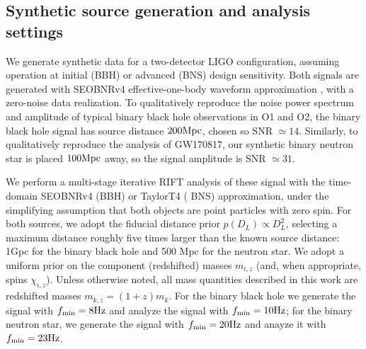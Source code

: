 \documentclass[twocolumn,prd,nofootinbib]{revtex4}
\newcommand\unit[1]{{\rm #1}}
\begin{document}
\subsection{Synthetic source generation and analysis settings}


We generate  synthetic data for a two-detector LIGO configuration, assuming operation at  initial (BBH) or advanced (BNS) design  sensitivity.
Both signals are generated with SEOBNRv4 effective-one-body waveform approximation \cite{2017PhRvD..95d4028B}, with a zero-noise data realization.   
To qualitatively reproduce the noise power spectrum and amplitude of typical binary black hole observations in O1 and
O2, the binary black hole signal has source distance $200 \unit{Mpc}$, chosen so SNR $\simeq 14$.  
Similarly, to qualitatively reproduce the analysis of GW170817, our synthetic binary neutron star is placed $100
\unit{Mpc}$ away, so the signal amplitude is SNR $\simeq 31$.

 We perform a multi-stage iterative RIFT analysis of these signal with the
time-domain SEOBNRv4 (BBH) or TaylorT4 \cite{gw-astro-PN-Comparison-AlessandraSathya2009}( BNS) approximation, under the simplifying assumption that both objects are point particles with zero
spin.   For both sources, we adopt the fiducial distance prior $p(D_L) \propto D_L^2$,   selecting  a maximum distance
roughly five times larger than the known source distance: 1Gpc for the binary black hole and 500 Mpc for the neutron
star.  We adopt a uniform prior on the component (redshifted) masses $m_{i,z}$ (and, when appropriate, spins
$\chi_{i,z}$).
Unless otherwise noted, all mass quantities described in this work are redshifted masses $m_{k,z}=(1+z)m_k$.
For the binary black hole we generate the signal with $f_{\rm min}=8 \unit{Hz}$ and analyze the signal with  $f_{\rm
  min}=10 \unit{Hz}$; for the binary neutron star, we generate the signal with $f_{\rm min}=20\unit{Hz}$ and anayze it
with $f_{\rm min}=23\unit{Hz}$.
\end{document}
